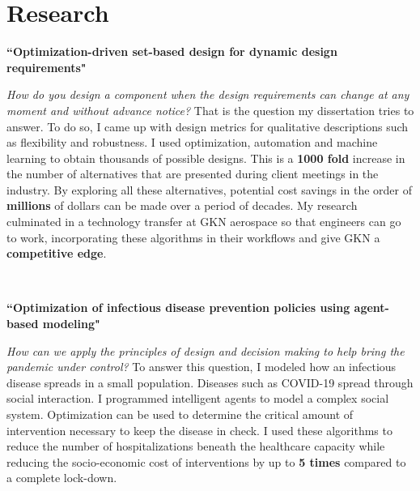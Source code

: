 \documentclass[10pt]{article} %
\begin{document}

\vspace{-\baselineskip}\medskip %


\section{Research}

{\raggedright\textbf{``Optimization-driven set-based design for dynamic design requirements"}}
\textit{\center How do you design a component when the design requirements can change at any moment and without advance notice?}
That is the question my dissertation tries to answer. To do so, I came up with design metrics for qualitative descriptions such as flexibility and robustness. I used optimization, automation and machine learning to obtain thousands of possible designs. This is a \textbf{1000 fold} increase in the number of alternatives that are presented during client meetings in the industry. By exploring all these alternatives, potential cost savings in the order of \textbf{millions} of dollars can be made over a period of decades. My research culminated in a technology transfer at GKN aerospace so that engineers can go to work, incorporating these algorithms in their workflows and give GKN a \textbf{competitive edge}.

~~~~~

\medskip %

{\raggedright\textbf{``Optimization of infectious disease prevention policies using agent-based modeling"}}
\textit{\center How can we apply the principles of design and decision making to help bring the pandemic under control?}
To answer this question, I modeled how an infectious disease spreads in a small population. Diseases such as COVID-19 spread through social interaction. I programmed intelligent agents to model a complex social system. Optimization can be used to determine the critical amount of intervention necessary to keep the disease in check. I used these algorithms to reduce the number of hospitalizations beneath the healthcare capacity while reducing the socio-economic cost of interventions by up to \textbf{5 times} compared to a complete lock-down.
\end{document}
